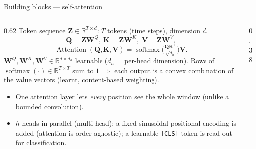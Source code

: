\documentclass[11pt, aspectratio=169]{beamer}
\newcommand{\R}{\mathbb{R}}
\newcommand{\softmax}{\operatorname{softmax}}
\newcommand{\Attn}{\operatorname{Attention}}
\begin{document}
\begin{frame}{Building blocks --- self-attention}
  \begin{columns}[T]
    \begin{column}{0.62\linewidth}
      \footnotesize
      Token sequence $\mathbf{Z}\in\R^{T\times d}$: $T$ tokens (time steps),
      dimension $d$.
      \[
        \mathbf{Q}=\mathbf{Z}\mathbf{W}^{Q},\;
        \mathbf{K}=\mathbf{Z}\mathbf{W}^{K},\;
        \mathbf{V}=\mathbf{Z}\mathbf{W}^{V},
      \]
      \[
        \Attn(\mathbf{Q},\mathbf{K},\mathbf{V})
          = \softmax\!\Big(\tfrac{\mathbf{Q}\mathbf{K}^{\top}}{\sqrt{d_h}}\Big)\mathbf{V}.
      \]
      $\mathbf{W}^{Q},\mathbf{W}^{K},\mathbf{W}^{V}\in\R^{d\times d_h}$ learnable
      ($d_h$ = per-head dimension). Rows of $\softmax(\cdot)\in\R^{T\times T}$
      sum to $1$ $\Rightarrow$ each output is a \alert{convex combination of the
      value vectors} (learnt, content-based weighting).
      \begin{itemize}
        \item One attention layer lets \emph{every} position see the whole
              window (unlike a bounded convolution).
        \item $h$ heads in parallel (multi-head); a fixed \alert{sinusoidal
              positional encoding} is added (attention is order-agnostic); a
              learnable \texttt{[CLS]} token is read out for classification.
      \end{itemize}
    \end{column}
    \begin{column}{0.38\linewidth}
      \centering
\end{column}
\end{columns}
\end{frame}
\end{document}
